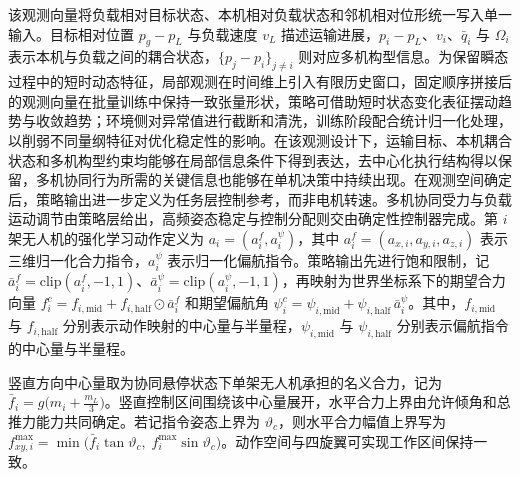 该观测向量将负载相对目标状态、本机相对负载状态和邻机相对位形统一写入单一输入。目标相对位置 $p_g-p_L$ 与负载速度 $v_L$ 描述运输进展，$p_i-p_L$、$v_i$、$\bar q_i$ 与 $\Omega_i$ 表示本机与负载之间的耦合状态，$\{p_j-p_i\}_{j\ne i}$ 则对应多机构型信息。为保留瞬态过程中的短时动态特征，局部观测在时间维上引入有限历史窗口，固定顺序拼接后的观测向量在批量训练中保持一致张量形状，策略可借助短时状态变化表征摆动趋势与收敛趋势；环境侧对异常值进行截断和清洗，训练阶段配合统计归一化处理，以削弱不同量纲特征对优化稳定性的影响。在该观测设计下，运输目标、本机耦合状态和多机构型约束均能够在局部信息条件下得到表达，去中心化执行结构得以保留，多机协同行为所需的关键信息也能够在单机决策中持续出现。在观测空间确定后，策略输出进一步定义为任务层控制参考，而非电机转速。多机协同受力与负载运动调节由策略层给出，高频姿态稳定与控制分配则交由确定性控制器完成。第 $i$ 架无人机的强化学习动作定义为 $a_i=(a_i^f,a_i^\psi)$，其中 $a_i^f=(a_{x,i},a_{y,i},a_{z,i})$ 表示三维归一化合力指令，$a_i^\psi$ 表示归一化偏航指令。策略输出先进行饱和限制，记 $\bar a_i^f = \mathrm{clip}(a_i^f,-1,1)$、$\bar a_i^\psi = \mathrm{clip}(a_i^\psi,-1,1)$，再映射为世界坐标系下的期望合力向量 $f_i^c = f_{i,\mathrm{mid}} + f_{i,\mathrm{half}}\odot \bar a_i^f$ 和期望偏航角 $\psi_i^c = \psi_{i,\mathrm{mid}} + \psi_{i,\mathrm{half}}\,\bar a_i^\psi$。其中，$f_{i,\mathrm{mid}}$ 与 $f_{i,\mathrm{half}}$ 分别表示动作映射的中心量与半量程，$\psi_{i,\mathrm{mid}}$ 与 $\psi_{i,\mathrm{half}}$ 分别表示偏航指令的中心量与半量程。

竖直方向中心量取为协同悬停状态下单架无人机承担的名义合力，记为 $\bar f_i = g\big(m_i+\frac{m_L}{3}\big)$。竖直控制区间围绕该中心量展开，水平合力上界由允许倾角和总推力能力共同确定。若记指令姿态上界为 $\vartheta_c$，则水平合力幅值上界写为 $f_{xy,i}^{\max} = \min\big(\bar f_i\tan\vartheta_c,\; f_i^{\max}\sin\vartheta_c\big)$。动作空间与四旋翼可实现工作区间保持一致。

